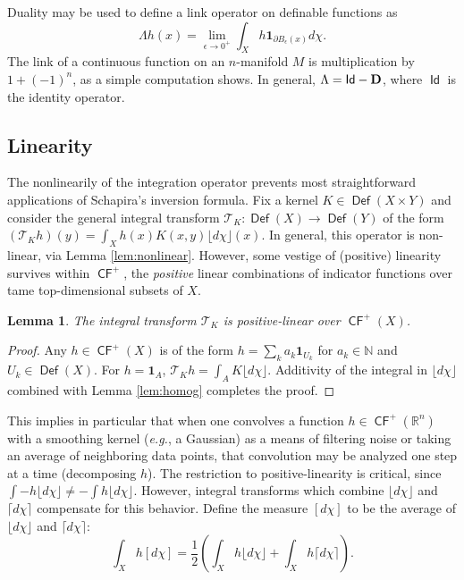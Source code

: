 \documentclass{psapm-l}
\newtheorem{lemma}[theorem]{Lemma}
\theoremstyle{definition}
\theoremstyle{remark}
\numberwithin{equation}{section}
\begin{document}
Duality may be used to define a link operator on definable functions as
\begin{equation}
\label{eq:link}
    \Lambda h(x)
    =
    \lim_{\epsilon\to 0^+}\int_Xh{{\mathbf{1}}}_{\partial B_\epsilon(x)}d\chi.
\end{equation}
The link of a continuous function on an $n$-manifold $M$ is multiplication by $1+(-1)^n$, as a simple computation shows. In general, $\Lambda = {{{\operatorname{\mathsf{{Id}}}}}} - {{\bf D}}$, where ${{{\operatorname{\mathsf{{Id}}}}}}$ is the identity operator.

\subsection{Linearity}
\label{sec:linearity}

The nonlinearily of the integration operator prevents most straightforward applications of Schapira's inversion formula. Fix a kernel $K\in{{{\operatorname{\mathsf{{Def}}}}}}(X\times Y)$ and consider the general integral transform ${{\mathcal T}}_K\colon{{{\operatorname{\mathsf{{Def}}}}}}(X)\to{{{\operatorname{\mathsf{{Def}}}}}}(Y)$ of the form $({{\mathcal T}}_K h)(y)=\int_Xh(x)K(x,y){{\lfloor d\chi\rfloor}}(x)$. In general, this operator is non-linear, via Lemma \ref{lem:nonlinear}. However, some vestige of (positive) linearity survives within ${{{\operatorname{\mathsf{{CF}}}}}}^+$, the {\em positive} linear combinations of indicator functions over tame top-dimensional subsets of $X$.

\begin{lemma}
\label{lem:CF^+}
The integral transform ${{\mathcal T}}_K$ is positive-linear over ${{{\operatorname{\mathsf{{CF}}}}}}^+(X)$.
\end{lemma}
\begin{proof}
Any $h\in {{{\operatorname{\mathsf{{CF}}}}}}^+(X)$ is of the form $h=\sum_k a_k{{\mathbf{1}}}_{U_k}$ for $a_k\in{{\mathbb N}}$ and $U_k\in{{{\operatorname{\mathsf{{Def}}}}}}(X)$. For $h={{\mathbf{1}}}_A$, ${{\mathcal T}}_K h = \int_A K {{\lfloor d\chi\rfloor}}$. Additivity of the integral in ${{\lfloor d\chi\rfloor}}$ combined with Lemma \ref{lem:homog} completes the proof.
\end{proof}

This implies in particular that when one convolves a function $h\in {{{\operatorname{\mathsf{{CF}}}}}}^+({{\mathbb R}}^n)$ with a smoothing kernel ({{\em e.g.}}, a Gaussian) as a means of filtering noise or taking an average of neighboring data points, that convolution may be analyzed one step at a time (decomposing $h$).
The restriction to positive-linearity is critical, since $\int -h{{\lfloor d\chi\rfloor}} \neq -\int h{{\lfloor d\chi\rfloor}}$. However, integral transforms which combine ${{\lfloor d\chi\rfloor}}$ and ${{\lceil d\chi\rceil}}$ compensate for this behavior. Define the measure $[d\chi]$ to be the average of ${{\lfloor d\chi\rfloor}}$
and ${{\lceil d\chi\rceil}}$:
\begin{equation}
    \int_X h[d\chi] = \frac{1}{2}\left(\int_X h{{\lfloor d\chi\rfloor}} + \int_X h{{\lceil d\chi\rceil}}\right) .
\end{equation}
\end{document}

